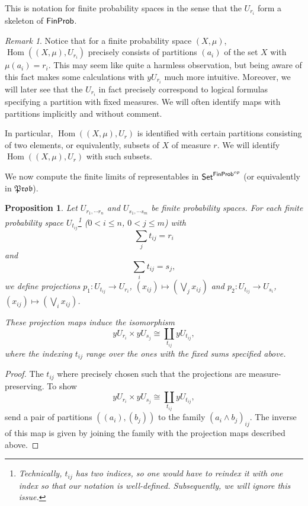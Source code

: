\documentclass[a4paper]{amsproc}
\theoremstyle{plain}
\newtheorem{proposition}[theorem]{Proposition}
\theoremstyle{definition}
\theoremstyle{remark}
\newtheorem{remark}[theorem]{Remark}
\numberwithin{equation}{section}
\DeclareMathOperator{\Hom}{Hom}
\newcommand{\y}{\textit{y}}
\newcommand{\Set}{\textup{\textsf{Set}}}
\newcommand{\FinProb}{\textup{\textsf{FinProb}}}
\newcommand{\Prob}{\mathfrak{Prob}}
\begin{document}
This is notation for finite probability spaces in the sense that the $U_{r_i}$ form a skeleton of $\FinProb$.

\begin{remark}\label{classifying_partitions}
    Notice that for a finite probability space $(X,\mu)$, $\Hom((X,\mu), U_{r_i})$ precisely consists of partitions $(a_i)$ of the set $X$ with $\mu(a_i) = r_i$. This may seem like quite a harmless observation, but being aware of this fact makes some calculations with $\y U_{r_i}$ much more intuitive. Moreover, we will later see that the $U_{r_i}$ in fact precisely correspond to logical formulas specifying a partition with fixed measures. We will often identify maps with partitions implicitly and without comment.

    In particular, $\Hom((X,\mu), U_r)$ is identified with certain partitions consisting of two elements, or equivalently, subsets of $X$ of measure $r$. We will identify $\Hom((X,\mu), U_r)$ with such subsets.

\end{remark}

We now compute the finite limits of representables in $\Set^{\FinProb^{op}}$ (or equivalently in $\Prob$).

\begin{proposition} \label{multi-product}
    Let $U_{r_1, \cdots r_n}$ and $U_{s_1, \cdots s_m}$ be finite probability spaces. For each finite probability space $U_{t_{ij}}$\footnote{Technically, $t_{ij}$ has two indices, so one would have to reindex it with one index so that our notation is well-defined. Subsequently, we will ignore this issue.} ($0 < i \leq n$, $0 < j \leq m$) with
    \[
        \sum_j t_{ij} = r_i
    \]
    and
    \[
        \sum_i t_{ij} = s_j ,
    \]
    we define projections $p_1: U_{t_{ij}} \to U_{r_i}$, $(x_{ij}) \mapsto (\bigvee_j x_{ij})$ and $p_2: U_{t_{ij}} \to U_{s_i}$, $(x_{ij}) \mapsto (\bigvee_i x_{ij})$.

    These projection maps induce the isomorphism
    \[
    \y U_{r_i} \times \y U_{s_j} \cong \coprod_{t_{ij}} \y U_{t_{ij}} ,
    \]
    where the indexing $t_{ij}$ range over the ones with the fixed sums specified above.
\end{proposition}
\begin{proof}
    The $t_{ij}$ where precisely chosen such that the projections are measure-preserving. To show
    \[
    \y U_{r_i} \times \y U_{s_j} \cong \coprod_{t_{ij}} \y U_{t_{ij}} ,
    \]
    send a pair of partitions $((a_i),(b_j))$ to the family $(a_i \wedge b_j)_{ij}$. The inverse of this map is given by joining the family with the projection maps described above.
\end{proof}
\end{document}
